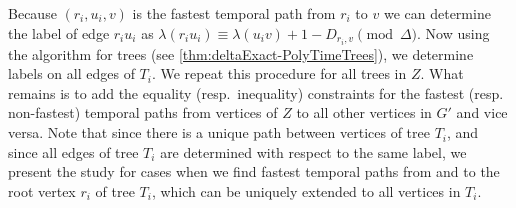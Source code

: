 \documentclass[11pt,a4paper]{article}
\theoremstyle{remark}
\theoremstyle{definition}
\begin{document}
Because $(r_i,u_i,v)$ is the fastest temporal path from $r_i$ to $v$ we can determine the label of edge $r_iu_i$ as 
$\lambda (r_i u_i) \equiv \lambda(u_i v) + 1 - D_{r_i,v} \pmod \Delta$.
Now using the algorithm for trees (see \cref{thm:deltaExact-PolyTimeTrees}), we determine labels on all edges of $T_i$.
We repeat this procedure for all trees in $Z$.
What remains is to add the equality (resp.~inequality) constraints for the fastest (resp. non-fastest) temporal paths from vertices of $Z$ to all other vertices in $G'$ and vice versa.
Note that since 
there is a unique path between vertices of tree $T_i$, and since all edges of tree $T_i$ are determined with respect to the same label,
we present the study for cases when we find fastest temporal paths from and to the root vertex $r_i$ of tree $T_i$, 
which can be uniquely extended to all vertices in $T_i$.
\end{document}

